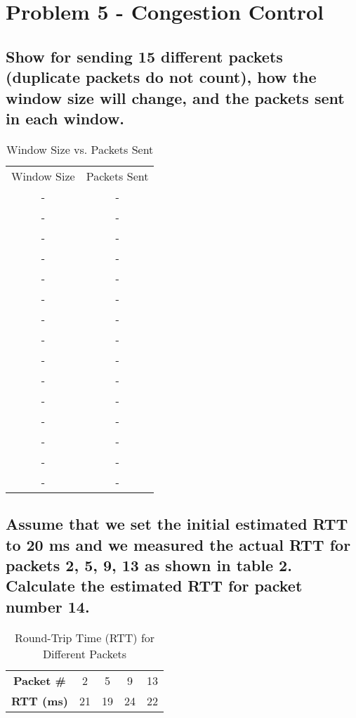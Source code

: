 \documentclass{article}
\begin{document}
\section{Problem 5 - Congestion Control}

\subsection{Show for sending 15 different packets (duplicate packets do not count), how the
window size will change, and the packets sent in each window.}

	\begin{table}[h]
		\centering
		\begin{tabular}{cc}
			Window Size & Packets Sent \\
			- & - \\
			- & - \\
			- & - \\
			- & - \\
			- & - \\
			- & - \\
			- & - \\
			- & - \\
			- & - \\
			- & - \\
			- & - \\
			- & - \\
			- & - \\
			- & - \\
			- & - \\
		\end{tabular}
		\caption{Window Size vs. Packets Sent}
		\label{tab:window_packets}
	\end{table}

\subsection{Assume that we set the initial estimated RTT to 20 ms and we measured the
actual RTT for packets 2, 5, 9, 13 as shown in table 2. Calculate the estimated RTT for
packet number 14.}

	\begin{table}[h]
		\centering
		\begin{tabular}{ccccc}
			\textbf{Packet \#} & 2  & 5  & 9  & 13 \\
			\textbf{RTT (ms)}  & 21 & 19 & 24 & 22 \\
		\end{tabular}
		\caption{Round-Trip Time (RTT) for Different Packets}
		\label{tab:rtt_data}
	\end{table}
\end{document}
